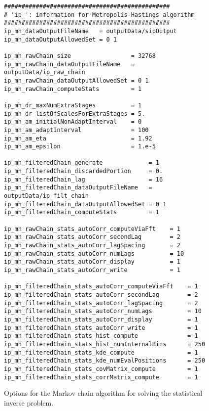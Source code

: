 \begin{figure}[h!]
\begin{center}
\begin{verbatim}
###############################################
# 'ip_': information for Metropolis-Hastings algorithm
###############################################
ip_mh_dataOutputFileName   = outputData/sipOutput
ip_mh_dataOutputAllowedSet = 0 1

ip_mh_rawChain_size                 = 32768
ip_mh_rawChain_dataOutputFileName   = outputData/ip_raw_chain
ip_mh_rawChain_dataOutputAllowedSet = 0 1
ip_mh_rawChain_computeStats         = 1

ip_mh_dr_maxNumExtraStages          = 1
ip_mh_dr_listOfScalesForExtraStages = 5.
ip_mh_am_initialNonAdaptInterval    = 0
ip_mh_am_adaptInterval              = 100
ip_mh_am_eta                        = 1.92
ip_mh_am_epsilon                    = 1.e-5

ip_mh_filteredChain_generate             = 1
ip_mh_filteredChain_discardedPortion     = 0.
ip_mh_filteredChain_lag                  = 16
ip_mh_filteredChain_dataOutputFileName   = outputData/ip_filt_chain
ip_mh_filteredChain_dataOutputAllowedSet = 0 1
ip_mh_filteredChain_computeStats         = 1

ip_mh_rawChain_stats_autoCorr_computeViaFft    = 1
ip_mh_rawChain_stats_autoCorr_secondLag        = 2
ip_mh_rawChain_stats_autoCorr_lagSpacing       = 2
ip_mh_rawChain_stats_autoCorr_numLags          = 10
ip_mh_rawChain_stats_autoCorr_display          = 1
ip_mh_rawChain_stats_autoCorr_write            = 1

ip_mh_filteredChain_stats_autoCorr_computeViaFft    = 1
ip_mh_filteredChain_stats_autoCorr_secondLag        = 2
ip_mh_filteredChain_stats_autoCorr_lagSpacing       = 2
ip_mh_filteredChain_stats_autoCorr_numLags          = 10
ip_mh_filteredChain_stats_autoCorr_display          = 1
ip_mh_filteredChain_stats_autoCorr_write            = 1
ip_mh_filteredChain_stats_hist_compute              = 1
ip_mh_filteredChain_stats_hist_numInternalBins      = 250
ip_mh_filteredChain_stats_kde_compute               = 1
ip_mh_filteredChain_stats_kde_numEvalPositions      = 250
ip_mh_filteredChain_stats_covMatrix_compute         = 1
ip_mh_filteredChain_stats_corrMatrix_compute        = 1

\end{verbatim}
\end{center}
\caption{
Options for the Markov chain algorithm for solving the statistical inverse problem.
}
\label{fig-options-input-2}
\end{figure}

